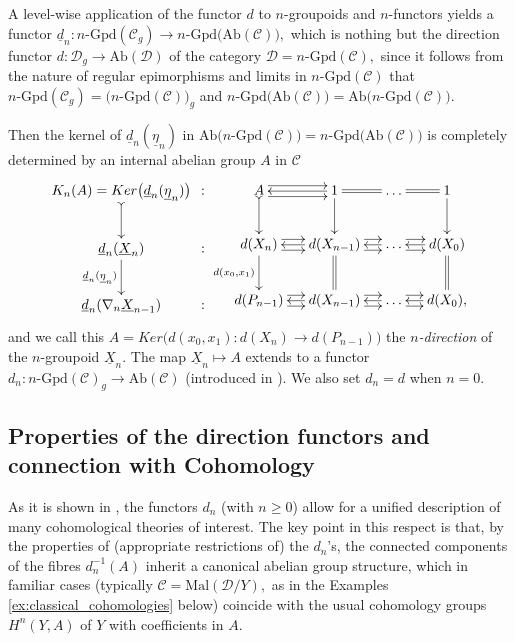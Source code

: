 \documentclass[11pt]{amsart}
\theoremstyle{plain}
\theoremstyle{definition}
\theoremstyle{remark}
\begin{document}
A level-wise application of the functor $d$ to $n$-groupoids and $n$-functors yields a functor $\underline{d}_n\colon n\text{-}\mathrm{Gpd}(\mathcal{C}_g)\rightarrow n\text{-}\mathrm{Gpd}\big(\mathrm{Ab}(\mathcal{C})\big),$ which is nothing but the direction functor $d\colon\mathcal{D}_g\rightarrow\mathrm{Ab}(\mathcal{D})$ of the category $\mathcal{D}=n\text{-}\mathrm{Gpd}(\mathcal{C}),$ since it follows from the nature of regular epimorphisms and limits in $n\text{-}\mathrm{Gpd}(\mathcal{C})$ that $n\text{-}\mathrm{Gpd}(\mathcal{C}_g)=\big(n\text{-}\mathrm{Gpd}(\mathcal{C})\big)_g$ and $n\text{-}\mathrm{Gpd}\big(\mathrm{Ab}(\mathcal{C})\big)=\mathrm{Ab}\big(n\text{-}\mathrm{Gpd}(\mathcal{C})\big).$

Then the kernel of $\underline{d}_n(\underline{\eta}_n)$ in $\mathrm{Ab}\big(n\text{-}\mathrm{Gpd}(\mathcal{C})\big)=n\text{-}\mathrm{Gpd}\big(\mathrm{Ab}(\mathcal{C})\big)$ is completely determined by an internal abelian group $A$ in $\mathcal{C}$
\begin{equation*}
\begin{aligned}
{
\xymatrixcolsep{0.1pc}
\xymatrix{
{K_n(A)=Ker\big(\underline{d}_n(\underline{\eta}_n)\big)} \ar@{>->}[d] &{:} \\
{\underline{d}_n(\underline{X}_n}) \ar[d]_-{\underline{d}_n(\underline{\eta}_n)} &{:}\\
{\underline{d}_n(\nabla_n\underline{X}_{n-1})} &{:}
}
}
{
\xymatrixcolsep{1pc}
\xymatrix{
{A} \ar@<.9ex>[r] \ar@<-.9ex>[r] \ar@{>->}[d] &{1}\ar[l] \ar[d] \ar@{=}[r] &{\dots} \ar@{=}[r] &{1} \ar[d] \\
{d(X_n)} \ar[d]_-{d(x_0,x_1)} \ar@<.9ex>[r] \ar@<-.9ex>[r] &{d(X_{n-1})} \ar@{=}[d] \ar[l] \ar@<.9ex>[r] \ar@<-.9ex>[r] &{\dots} \ar[l] \ar@<.9ex>[r] \ar@<-.9ex>[r] &{d(X_0)} \ar@{=}[d] \ar[l] \\
{d(P_{n-1})} \ar@<.9ex>[r] \ar@<-.9ex>[r] &{d(X_{n-1})} \ar[l] \ar@<.9ex>[r] \ar@<-.9ex>[r] &{\dots} \ar[l] \ar@<.9ex>[r] \ar@<-.9ex>[r] &{d(X_0),} \ar[l]
}
}
\end{aligned}
\end{equation*}
and we call this $A=Ker\big(d(x_0,x_1)\colon d(X_n)\rightarrow d(P_{n-1})\big)$ the $n$\emph{-direction} of the $n$-groupoid $\underline{X}_n.$ The map $\underline{X}_n\mapsto A$ extends to a functor $d_n\colon n\text{-}\mathrm{Gpd}(\mathcal{C})_g\rightarrow\mathrm{Ab}(\mathcal{C})$ (introduced in \cite{bourn-rodelo}). We also set $d_n=d$ when $n=0.$
\subsection{Properties of the direction functors and connection with Cohomology}
As it is shown in \cite{baer-sums, bourn-rodelo}, the functors $d_n$ (with $n\geq0$) allow for a unified description of many cohomological theories of interest. The key point in this respect is that, by the properties of (appropriate restrictions of) the $d_n$'s, the connected components of the fibres $d_n^{-1}(A)$ inherit a canonical abelian group structure, which in familiar cases (typically $\mathcal{C}=\mathrm{Mal}(\mathcal{D}/Y),$ as in the Examples \ref{ex:classical_cohomologies} below) coincide with the usual cohomology groups $H^n(Y,A)$ of $Y$ with coefficients in $A.$
\end{document}
